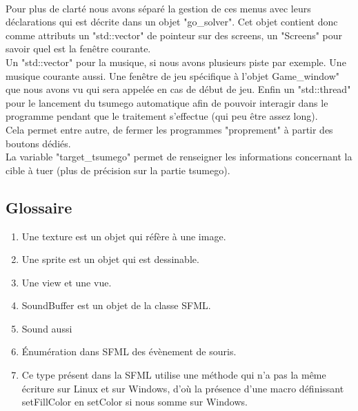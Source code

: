                 \paragraph{}Pour plus de clarté nous avons séparé la gestion de ces menus avec leurs déclarations qui est décrite dans un objet "go\_solver". Cet objet contient donc comme attributs un "std::vector" de pointeur sur des screens, un "Screens" pour savoir quel est la fenêtre courante.\\
                Un "std::vector" pour la musique, si nous avons plusieurs piste par exemple. Une musique courante aussi. Une fenêtre de jeu spécifique à l'objet Game\_window" que nous avons vu qui sera appelée en cas de début de jeu. Enfin un "std::thread" pour le lancement du tsumego automatique afin de pouvoir interagir dans le programme pendant que le traitement s'effectue (qui peu être assez long).\\
                Cela permet entre autre, de fermer les programmes "proprement" à partir des boutons dédiés. \\
                La variable "target\_tsumego" permet de renseigner les informations concernant la cible à tuer (plus de précision sur la partie tsumego).
        
        \subsection{Glossaire}
            \begin{enumerate}
                \item Une texture est un objet qui réfère à une image.
                \item Une sprite est un objet qui est dessinable.
                \item Une view et une vue.
                \item SoundBuffer est un objet de la classe SFML.
                \item Sound aussi 
                \item Énumération dans SFML des évènement de souris.
                \item Ce type présent dans la SFML utilise une méthode qui n'a pas la même écriture sur Linux et sur Windows, d'où la présence d'une macro définissant setFillColor en setColor si nous somme sur Windows. 
            \end{enumerate}